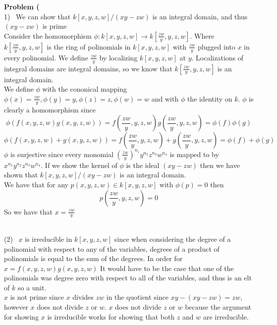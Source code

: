 \documentclass[12pt]{article}
\newenvironment{ques}[1]{\textbf{Problem #1}\vspace{1 mm}\\ }{\bigskip}
\theoremstyle{definition}
\renewcommand{\l}{\left }
\renewcommand{\r}{\right }
\begin{document}
\begin{ques}{1.6}
	(1) \ We can show that $k[x,y,z,w]/(xy - zw)$ is an integral domain, and
	thus $(xy-zw)$ is prime\\
	Consider the homomorphism $\phi :k[x,y,z,w] \to k[\frac{zw}{y}, y, z, w]$.
	Where $k[\frac{zw}{y}, y, z, w]$ is the ring of polinomials in $k[x,y,z,w]$
	with $\frac{zw}{y}$ plugged into $x$ in every polinomial. We define
	$\frac{zw}{y}$ by localizing $k[x,y,z,w]$ at $y$. Localizations of integral
	domains are integral domains, so we know that $k[\frac{zw}{y}, y, z, w]$ is
	an integral domain.\\
	We define $\phi$ with the cononical mapping $\phi(x) = \frac{zw}{y},
	\phi(y) = y, \phi(z) = z, \phi(w) = w$ and with $\phi$ the identity on $k$.
	$\phi$ is clearly a homomorphism since
	$$\phi(f(x,y,z,w)g(x,y,z,w)) = f(\frac{zw}{y}, y, z, w)g(\frac{zw}{y}, y,
	z, w) = \phi(f)\phi(g)$$ 
	$$\phi(f(x,y,z,w) + g(x,y,z,w)) = f(\frac{zw}{y}, y, z, w) +
	g(\frac{zw}{y}, y, z, w) = \phi(f) + \phi(g)$$ 
	$\phi$ is surjective since every monomial $\l(\frac{zw}{y}\r)^{n_1} y^{n_2}
	z^{n_3} w^{n_4}$ is mapped to by $x^{n_1} y^{n_2} z^{n_3} w^{n_4}$. If we
	show the kernel of $\phi$ is the ideal $(xy-zw)$ then we have shown that
	$k[x,y,z,w]/(xy -zw)$ is an integral domain.\\
	We have that for any $p(x,y,z,w) \in k[x,y,z,w]$ with $\phi(p) = 0$ then
	$$p(\frac{zw}{y},y,z,w) = 0$$
	So we have that $x = \frac{zw}{y}$ 

\\
	(2) \ $x$ is irreducible in $k[x,y,z,w]$ since when considering the degree
	of a polinomial with respect to any of the variables, degrees of a product
	of polinomials is equal to the sum of the degrees. In order for $x =
	f(x,y,z,w)g(x,y,z,w)$ It would have to be the case that one of the
	polinomials was degree zero with respect to all of the variables, and thus
	is an elt of $k$ so a unit.\\
	$x$ is not prime since $x$ divides $zw$ in the quotient since $xy - (xy -
	zw) = zw$, however $x$ does not divide $z$ or $w$. $x$ does not divide $z$
	or $w$  because the argument for showing $x$ is irreducible works for
	showing that both $z$ and $w$ are irreducible.

\end{ques}
\end{document}
